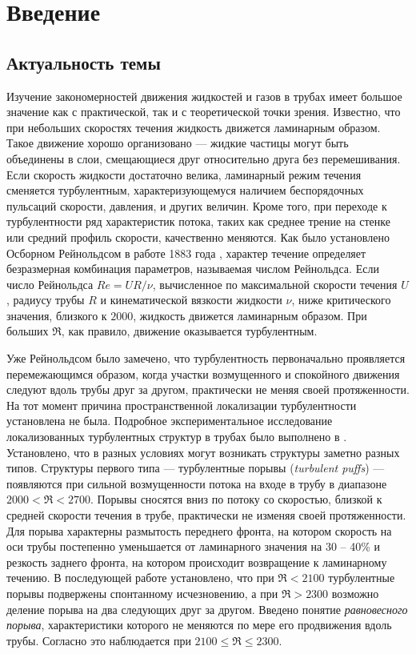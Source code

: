 \chapter{Введение}

\section{Актуальность темы} 

Изучение закономерностей движения жидкостей и газов в трубах имеет большое значение как с практической, так и с теоретической точки зрения. Известно, что при небольших скоростях течения жидкость движется ламинарным образом. Такое движение хорошо организовано --- жидкие частицы могут быть объединены в слои, смещающиеся друг относительно друга без перемешивания. Если скорость жидкости достаточно велика, ламинарный режим течения сменяется турбулентным, характеризующемуся наличием беспорядочных пульсаций скорости, давления, и других величин. Кроме того, при переходе к турбулентности ряд характеристик потока, таких как среднее трение на стенке или средний профиль скорости, качественно меняются. Как было установлено Осборном Рейнольдсом в работе 1883 года \cite{Reynolds1883}, характер течение определяет безразмерная комбинация параметров, называемая числом Рейнольдса. Если число Рейнольдса $Re=UR/\nu$, вычисленное по максимальной скорости течения $U$, радиусу трубы $R$ и кинематической вязкости жидкости $\nu$, ниже критического значения, близкого к $2000$, жидкость движется ламинарным образом. При больших $\Re$, как правило, движение оказывается турбулентным.

Уже Рейнольдсом было замечено, что турбулентность первоначально проявляется перемежающимся образом, когда участки возмущенного и спокойного движения следуют вдоль трубы друг за другом, практически не меняя своей протяженности. На тот момент причина пространственной локализации турбулентности установлена не была. Подробное экспериментальное исследование локализованных турбулентных структур в трубах было выполнено в \cite{Wygnanski1973}. Установлено, что в разных условиях могут возникать структуры заметно разных типов. Структуры первого типа --- турбулентные порывы ({\it turbulent puffs}) --- появляются при сильной возмущенности потока на входе в трубу в диапазоне $2000<\Re<2700$. Порывы сносятся вниз по потоку со скоростью, близкой к средней скорости течения в трубе, практически не изменяя своей протяженности. Для порыва характерны размытость переднего фронта, на котором скорость на оси трубы постепенно уменьшается от ламинарного значения на 30 -- 40\% и резкость заднего фронта, на котором происходит возвращение к ламинарному течению. В последующей работе \cite{Wygnanski1975} установлено, что при $\Re<2100$ турбулентные порывы подвержены спонтанному исчезновению, а при $\Re>2300$ возможно деление порыва на два следующих друг за другом. Введено понятие {\it равновесного порыва}, характеристики которого не меняются по мере его продвижения вдоль трубы. Согласно \cite{Wygnanski1975} это наблюдается при $2100\leqslant\Re\leqslant2300$. 

